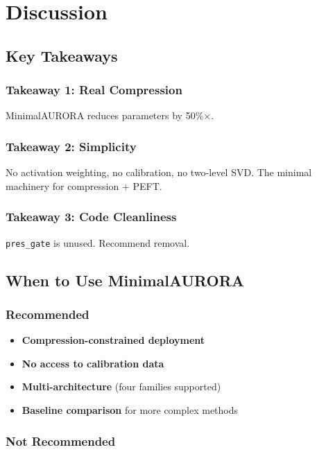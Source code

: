 \section{Discussion}

\subsection{Key Takeaways}

\subsubsection{Takeaway 1: Real Compression}

MinimalAURORA reduces parameters by 50\%$\times$.

\subsubsection{Takeaway 2: Simplicity}

No activation weighting, no calibration, no two-level SVD. The minimal 
machinery for compression + PEFT.

\subsubsection{Takeaway 3: Code Cleanliness}

\texttt{pres\_gate} is unused. Recommend removal.

\subsection{When to Use MinimalAURORA}

\subsubsection{Recommended}

\begin{itemize}
\item \textbf{Compression-constrained deployment}
\item \textbf{No access to calibration data}
\item \textbf{Multi-architecture} (four families supported)
\item \textbf{Baseline comparison} for more complex methods

\end{itemize}
\subsubsection{Not Recommended}

